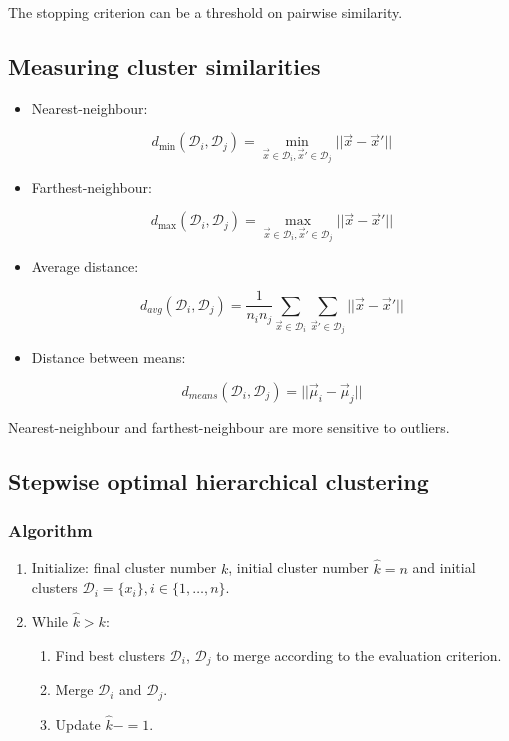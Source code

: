 		The stopping criterion can be a threshold on pairwise similarity.

	\subsection{Measuring cluster similarities}

	\begin{itemize}
		\item Nearest-neighbour:

			$$d_{\min}(\mathcal{D}_i,\mathcal{D}_j) = \min\limits_{\vec{x}\in\mathcal{D}_i,\vec{x}'\in\mathcal{D}_j} ||\vec{x}-\vec{x}'||$$

		\item Farthest-neighbour:

			$$d_{\max}(\mathcal{D}_i,\mathcal{D}_j) = \max\limits_{\vec{x}\in\mathcal{D}_i,\vec{x}'\in\mathcal{D}_j} ||\vec{x}-\vec{x}'||$$

		\item Average distance:

			$$d_{avg}(\mathcal{D}_i,\mathcal{D}_j) = \frac{1}{n_in_j}\sum\limits_{\vec{x}\in\mathcal{D}_i}\sum\limits_{\vec{x}'\in\mathcal{D}_j} ||\vec{x}-\vec{x}'||$$

		\item Distance between means:

			$$d_{means}(\mathcal{D}_i,\mathcal{D}_j) = ||\vec{\mu}_i-\vec{\mu}_j||$$

	\end{itemize}

	Nearest-neighbour and farthest-neighbour are more sensitive to outliers.



	\subsection{Stepwise optimal hierarchical clustering}

		\subsubsection{Algorithm}

		\begin{enumerate}
			\item Initialize: final cluster number $k$, initial cluster number $\hat{k} = n$ and initial clusters $\mathcal{D}_i = \{x_i\},i\in\{1,\dots,n\}$.
			\item While $\hat{k}> k$:

				\begin{enumerate}
					\item Find best clusters $\mathcal{D}_i$, $\mathcal{D}_j$ to merge according to the evaluation criterion.
					\item Merge $\mathcal{D}_i$ and $\mathcal{D}_j$.
					\item Update $\hat{k} -= 1$.
				\end{enumerate}

		\end{enumerate}

